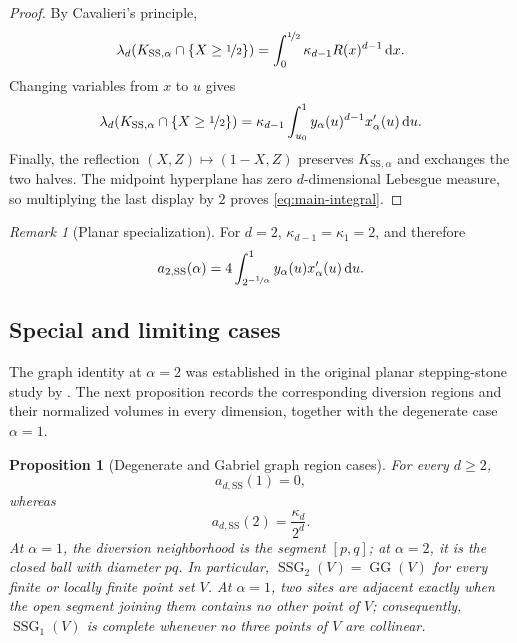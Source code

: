 \documentclass[a4paper,fleqn]{cas-dc}
\newtheorem{proposition}{Proposition}
\theoremstyle{definition}
\theoremstyle{remark}
\newtheorem{remark}{Remark}
\newcommand{\dd}{\,\mathrm{d}}
\newcommand{\0}{\mathbf{0}}
\DeclareMathOperator{\SSG}{SSG}
\DeclareMathOperator{\GG}{GG}
\begin{document}
\begin{proof}
By Cavalieri's principle,
\begin{equation}
\lambda_d(K_{\mathrm{SS},\alpha}\cap\{X\geq\nicefrac{1}{2}\})
=
\int_0^{\nicefrac{1}{2}}\kappa_{d-1}R(x)^{d-1}\dd x.
\end{equation}
Changing variables from $x$ to $u$ gives
\begin{equation}
\lambda_d(K_{\mathrm{SS},\alpha}\cap\{X\geq\nicefrac{1}{2}\})
=
\kappa_{d-1}
\int_{u_0}^{1}y_\alpha(u)^{d-1}x_\alpha'(u)\dd u.
\end{equation}
Finally, the reflection $(X,Z)\mapsto(1-X,Z)$ preserves $K_{\mathrm{SS},\alpha}$ and exchanges the two halves. The midpoint hyperplane has zero $d$-dimensional Lebesgue measure, so multiplying the last display by $2$ proves \eqref{eq:main-integral}.
\end{proof}

\begin{remark}[Planar specialization]
For $d=2$, $\kappa_{d-1}=\kappa_1=2$, and therefore
\begin{equation}
 a_{2,\mathrm{SS}}(\alpha)
 =
 4\int_{2^{-\nicefrac{1}{\alpha}}}^1
 y_{\alpha}(u)x_{\alpha}'(u)\dd u.
\end{equation}
\end{remark}


\subsection{Special and limiting cases}

The graph identity at $\alpha=2$ was established in the original planar
stepping-stone study by
\citet[Theorem~3.4]{kannangara2018stepping}. The next proposition records
the corresponding diversion regions and their normalized volumes in every
dimension, together with the degenerate case $\alpha=1$.

\begin{proposition}[Degenerate and Gabriel graph region cases]
\label{prop:special-cases}
For every $d\geq2$,
\begin{equation}\label{eq:degenerate-constant}
a_{d,\mathrm{SS}}(1)=0,
\end{equation}
whereas
\begin{equation}\label{eq:gabriel-constant}
a_{d,\mathrm{SS}}(2)=\frac{\kappa_d}{2^d}.
\end{equation}
At $\alpha=1$, the diversion neighborhood is the segment $[p,q]$; at $\alpha=2$,
it is the closed ball with diameter $pq$.
In particular, $\SSG_2(V)=\GG(V)$ for every finite or locally finite
point set $V$. At $\alpha=1$, two sites are adjacent exactly when the open segment
joining them contains no other point of $V$; consequently,
$\SSG_1(V)$ is complete whenever no three points of $V$ are collinear.
\end{proposition}
\end{document}

